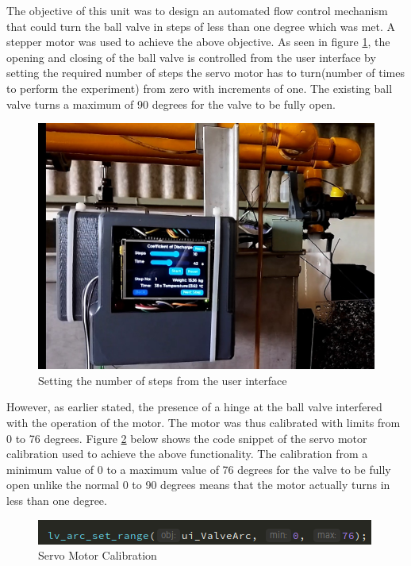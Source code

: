 The objective of this unit was to design an automated flow control mechanism that could turn the ball valve in steps of less than one degree which was met. A stepper motor was used to achieve the above objective. As seen in figure \ref{fig:Setting the number of steps from the user interface}, the opening and closing of the ball valve is controlled from the user interface by setting the required number of steps the servo motor has to turn(number of times to perform the experiment) from zero with increments of one. The existing ball valve turns a maximum of 90 degrees for the valve to be fully open.
\begin{figure}[H]
\centering
\includegraphics[width=.85\textwidth]{Figures/vid.jpg}
\caption{Setting the number of steps from the user interface}
\label{fig:Setting the number of steps from the user interface}
\end{figure}
However, as earlier stated, the presence of a hinge at the ball valve interfered with the operation of the motor. The motor was thus calibrated with limits from 0 to 76 degrees. Figure \ref{fig: Servo Motor Calibration} below shows the code snippet of the servo motor calibration used to achieve the above functionality. The calibration from a minimum value of 0 to a maximum value of 76 degrees for the valve to be fully open unlike the normal 0 to 90 degrees means that the motor actually turns in less than one degree.
\begin{figure}[H]
            \centering
            \includegraphics[width=.85\textwidth]{Figures/servo_limits.png}
            \caption{Servo Motor Calibration}
            \label{fig: Servo Motor Calibration}
        \end{figure}
